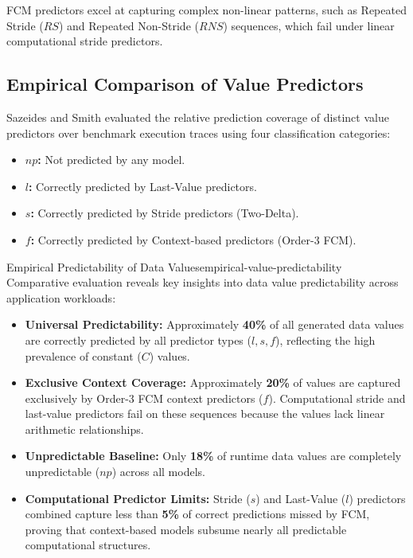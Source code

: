FCM predictors excel at capturing complex non-linear patterns, such as Repeated Stride ($RS$) and Repeated Non-Stride ($RNS$) sequences, which fail under linear computational stride predictors.

\subsection{Empirical Comparison of Value Predictors}
\label{subsec:empirical_predictor_comparison}

Sazeides and Smith evaluated the relative prediction coverage of distinct value predictors over benchmark execution traces using four classification categories:
\begin{itemize}
    \item \textbf{$np$:} Not predicted by any model.
    \item \textbf{$l$:} Correctly predicted by Last-Value predictors.
    \item \textbf{$s$:} Correctly predicted by Stride predictors (Two-Delta).
    \item \textbf{$f$:} Correctly predicted by Context-based predictors (Order-3 FCM).
\end{itemize}

\begin{observation}{Empirical Predictability of Data Values}{empirical-value-predictability}
Comparative evaluation reveals key insights into data value predictability across application workloads:
\begin{itemize}
    \item \textbf{Universal Predictability:} Approximately \textbf{40\%} of all generated data values are correctly predicted by all predictor types ($l, s, f$), reflecting the high prevalence of constant ($C$) values.
    \item \textbf{Exclusive Context Coverage:} Approximately \textbf{20\%} of values are captured exclusively by Order-3 FCM context predictors ($f$). Computational stride and last-value predictors fail on these sequences because the values lack linear arithmetic relationships.
    \item \textbf{Unpredictable Baseline:} Only \textbf{18\%} of runtime data values are completely unpredictable ($np$) across all models.
    \item \textbf{Computational Predictor Limits:} Stride ($s$) and Last-Value ($l$) predictors combined capture less than \textbf{5\%} of correct predictions missed by FCM, proving that context-based models subsume nearly all predictable computational structures.
\end{itemize}
\end{observation}

